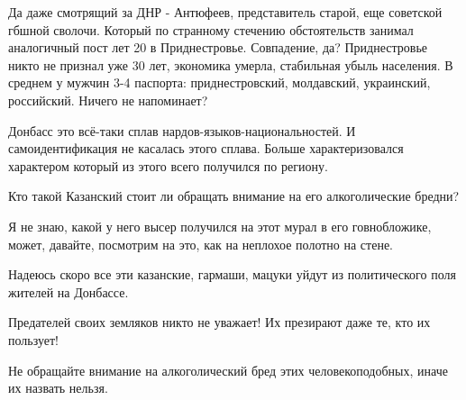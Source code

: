 \begin{itemize}
\begin{itemize}
Да даже смотрящий за ДНР - Антюфеев, представитель старой, еще советской гбшной
сволочи. Который по странному стечению обстоятельств занимал аналогичный пост
лет 20 в Приднестровье. Совпадение, да? Приднестровье никто не признал уже 30
лет, экономика умерла, стабильная убыль населения. В среднем у мужчин 3-4
паспорта: приднестровский, молдавский, украинский, российский. Ничего не
напоминает?


\end{itemize} %


Донбасс это всё-таки сплав нардов-языков-национальностей. И самоидентификация не
касалась этого сплава. Больше характеризовался характером который из этого всего
получился по региону.



Кто такой Казанский стоит ли обращать внимание на его алкоголические бредни?

Я не знаю, какой у него высер получился на этот мурал в его говнобложике,
может, давайте, посмотрим на это, как на неплохое полотно на стене.

Надеюсь скоро все эти казанские, гармаши, мацуки уйдут из политического поля
жителей на Донбассе.

Предателей своих земляков никто не уважает! Их презирают даже те, кто их
пользует!

Не обращайте внимание на алкоголический бред этих человекоподобных, иначе их
назвать нельзя.


\end{itemize} %
